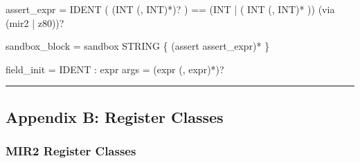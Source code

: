 \documentclass[
  11pt,
]{article}
\newenvironment{Shaded}{\begin{snugshade}}{\end{snugshade}}
\newcommand{\NormalTok}[1]{#1}
\begin{document}
\begin{Shaded}
\begin{Highlighting}[]
\NormalTok{assert\_expr    = IDENT \textquotesingle{}(\textquotesingle{} (INT (\textquotesingle{},\textquotesingle{} INT)*)? \textquotesingle{})\textquotesingle{} \textquotesingle{}==\textquotesingle{} (INT | \textquotesingle{}(\textquotesingle{} INT (\textquotesingle{},\textquotesingle{} INT)* \textquotesingle{})\textquotesingle{})}
\NormalTok{                 (\textquotesingle{}via\textquotesingle{} (\textquotesingle{}mir2\textquotesingle{} | \textquotesingle{}z80\textquotesingle{}))?}

\NormalTok{sandbox\_block  = \textquotesingle{}sandbox\textquotesingle{} STRING \textquotesingle{}\{\textquotesingle{} (\textquotesingle{}assert\textquotesingle{} assert\_expr)* \textquotesingle{}\}\textquotesingle{}}

\NormalTok{field\_init     = IDENT \textquotesingle{}:\textquotesingle{} expr}
\NormalTok{args           = (expr (\textquotesingle{},\textquotesingle{} expr)*)?}
\end{Highlighting}
\end{Shaded}

\begin{center}\rule{0.5\linewidth}{0.5pt}\end{center}

\hypertarget{appendix-b-register-classes}{%
\subsection{Appendix B: Register
Classes}\label{appendix-b-register-classes}}

\hypertarget{mir2-register-classes}{%
\subsubsection{MIR2 Register Classes}\label{mir2-register-classes}}
\end{document}
